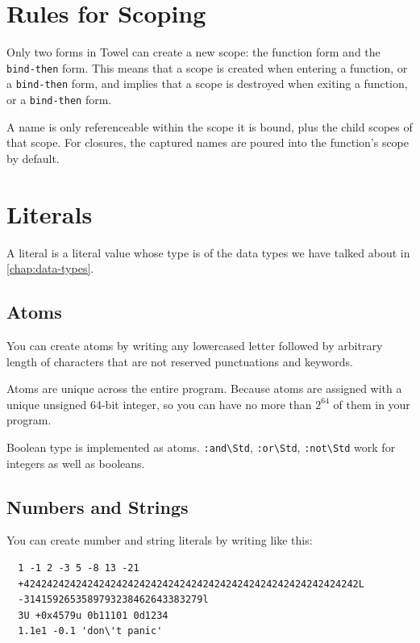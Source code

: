 \documentclass{report}
\newcommand{\mstd}[1]{\texttt{#1\textbackslash Std}}
\begin{document}
\section{Rules for Scoping}

Only two forms in Towel can create a new scope: the function form and the \texttt{bind-then} form. This means that a scope is created when entering a function, or a \texttt{bind-then} form, and implies that a scope is destroyed when exiting a function, or a \texttt{bind-then} form.

A name is only referenceable within the scope it is bound, plus the child scopes of that scope. For closures, the captured names are poured into the function's scope by default.

\section{Literals}

A literal is a literal value whose type is of the data types we have talked about in \autoref{chap:data-types}.

\subsection{Atoms}

You can create atoms by writing any lowercased letter followed by arbitrary length of characters that are not reserved punctuations and keywords.

Atoms are unique across the entire program. Because atoms are assigned with a unique unsigned 64-bit integer, so you can have no more than $2^{64}$ of them in your program.

\begin{mdframed}[style=detail]
  Boolean type is implemented as atoms. \mstd{:and}, \mstd{:or}, \mstd{:not} work for integers as well as booleans.
\end{mdframed}

\subsection{Numbers and Strings}

You can create number and string literals by writing like this:
\begin{mdframed}[style=example]
\begin{verbatim}
  1 -1 2 -3 5 -8 13 -21
  +4242424242424242424242424242424242424242424242424242424242L
  -3141592653589793238462643383279l
  3U +0x4579u 0b11101 0d1234
  1.1e1 -0.1 'don\'t panic'
\end{verbatim}
\end{mdframed}
\end{document}

